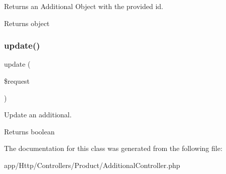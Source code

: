 Returns an Additional Object with the provided id.

\begin{DoxyReturn}{Returns}
object 
\end{DoxyReturn}
\mbox{\label{class_app_1_1_http_1_1_controllers_1_1_product_1_1_additional_controller_ab7b27a90191560dcef32126b0945db0d}} 
\subsubsection{\texorpdfstring{update()}{update()}}
{\footnotesize\ttfamily update (\begin{DoxyParamCaption}\item[{}]{\$request }\end{DoxyParamCaption})}

Update an additional.

\begin{DoxyReturn}{Returns}
boolean 
\end{DoxyReturn}


The documentation for this class was generated from the following file\+:\begin{DoxyCompactItemize}
\item 
app/\+Http/\+Controllers/\+Product/Additional\+Controller.\+php\end{DoxyCompactItemize}
